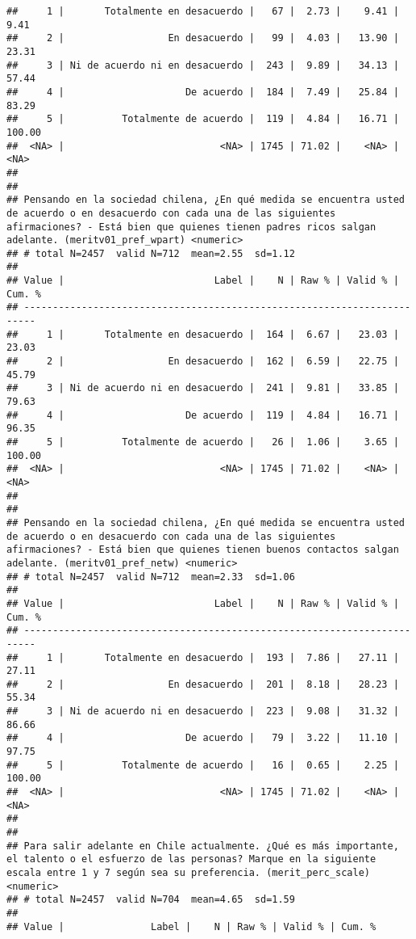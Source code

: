 \documentclass[
  10,
  landscape,
  legalpaper]{article}
\begin{document}
\begin{verbatim}
##     1 |       Totalmente en desacuerdo |   67 |  2.73 |    9.41 |   9.41
##     2 |                  En desacuerdo |   99 |  4.03 |   13.90 |  23.31
##     3 | Ni de acuerdo ni en desacuerdo |  243 |  9.89 |   34.13 |  57.44
##     4 |                     De acuerdo |  184 |  7.49 |   25.84 |  83.29
##     5 |          Totalmente de acuerdo |  119 |  4.84 |   16.71 | 100.00
##  <NA> |                           <NA> | 1745 | 71.02 |    <NA> |   <NA>
## 
## 
## Pensando en la sociedad chilena, ¿En qué medida se encuentra usted de acuerdo o en desacuerdo con cada una de las siguientes afirmaciones? - Está bien que quienes tienen padres ricos salgan adelante. (meritv01_pref_wpart) <numeric>
## # total N=2457  valid N=712  mean=2.55  sd=1.12
## 
## Value |                          Label |    N | Raw % | Valid % | Cum. %
## ------------------------------------------------------------------------
##     1 |       Totalmente en desacuerdo |  164 |  6.67 |   23.03 |  23.03
##     2 |                  En desacuerdo |  162 |  6.59 |   22.75 |  45.79
##     3 | Ni de acuerdo ni en desacuerdo |  241 |  9.81 |   33.85 |  79.63
##     4 |                     De acuerdo |  119 |  4.84 |   16.71 |  96.35
##     5 |          Totalmente de acuerdo |   26 |  1.06 |    3.65 | 100.00
##  <NA> |                           <NA> | 1745 | 71.02 |    <NA> |   <NA>
## 
## 
## Pensando en la sociedad chilena, ¿En qué medida se encuentra usted de acuerdo o en desacuerdo con cada una de las siguientes afirmaciones? - Está bien que quienes tienen buenos contactos salgan adelante. (meritv01_pref_netw) <numeric>
## # total N=2457  valid N=712  mean=2.33  sd=1.06
## 
## Value |                          Label |    N | Raw % | Valid % | Cum. %
## ------------------------------------------------------------------------
##     1 |       Totalmente en desacuerdo |  193 |  7.86 |   27.11 |  27.11
##     2 |                  En desacuerdo |  201 |  8.18 |   28.23 |  55.34
##     3 | Ni de acuerdo ni en desacuerdo |  223 |  9.08 |   31.32 |  86.66
##     4 |                     De acuerdo |   79 |  3.22 |   11.10 |  97.75
##     5 |          Totalmente de acuerdo |   16 |  0.65 |    2.25 | 100.00
##  <NA> |                           <NA> | 1745 | 71.02 |    <NA> |   <NA>
## 
## 
## Para salir adelante en Chile actualmente. ¿Qué es más importante, el talento o el esfuerzo de las personas? Marque en la siguiente escala entre 1 y 7 según sea su preferencia. (merit_perc_scale) <numeric>
## # total N=2457  valid N=704  mean=4.65  sd=1.59
## 
## Value |               Label |    N | Raw % | Valid % | Cum. %

\end{verbatim}
\end{document}
